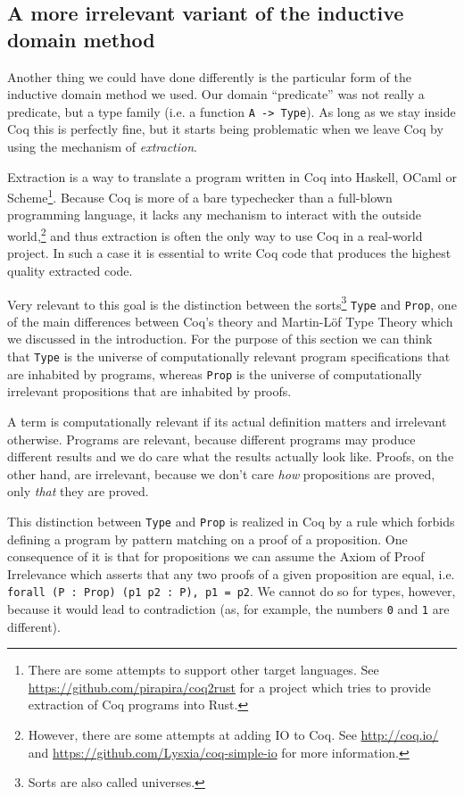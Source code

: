 \documentclass[declaration,mgr,english,shortabstract]{iithesis}
\newcommand{\m}[1]{\texttt{#1}}
\begin{document}
\subsection{A more irrelevant variant of the inductive domain method} \label{irrelevant}

Another thing we could have done differently is the particular form of the inductive domain method we used. Our domain ``predicate'' was not really a predicate, but a type family (i.e. a function \m{A -> Type}). As long as we stay inside Coq this is perfectly fine, but it starts being problematic when we leave Coq by using the mechanism of \textit{extraction}.

Extraction is a way to translate a program written in Coq into Haskell, OCaml or Scheme\footnote{There are some attempts to support other target languages. See \url{https://github.com/pirapira/coq2rust} for a project which tries to provide extraction of Coq programs into Rust.}. Because Coq is more of a bare typechecker than a full-blown programming language, it lacks any mechanism to interact with the outside world,\footnote{However, there are some attempts at adding IO to Coq. See \url{http://coq.io/} and \url{https://github.com/Lysxia/coq-simple-io} for more information.} and thus extraction is often the only way to use Coq in a real-world project. In such a case it is essential to write Coq code that produces the highest quality extracted code.

Very relevant to this goal is the distinction between the sorts\footnote{Sorts are also called universes.} \m{Type} and \m{Prop}, one of the main differences between Coq's theory and Martin-L\"{o}f Type Theory which we discussed in the introduction. For the purpose of this section we can think that \m{Type} is the universe of computationally relevant program specifications that are inhabited by programs, whereas \m{Prop} is the universe of computationally irrelevant propositions that are inhabited by proofs.

A term is computationally relevant if its actual definition matters and irrelevant otherwise. Programs are relevant, because different programs may produce different results and we do care what the results actually look like. Proofs, on the other hand, are irrelevant, because we don't care \textit{how} propositions are proved, only \textit{that} they are proved.

This distinction between \m{Type} and \m{Prop} is realized in Coq by a rule which forbids defining a program by pattern matching on a proof of a proposition. One consequence of it is that for propositions we can assume the Axiom of Proof Irrelevance which asserts that any two proofs of a given proposition are equal, i.e. \m{forall (P\ :\ Prop) (p1 p2\ :\ P), p1 = p2}. We cannot do so for types, however, because it would lead to contradiction (as, for example, the numbers \m{0} and \m{1} are different).
\end{document}
